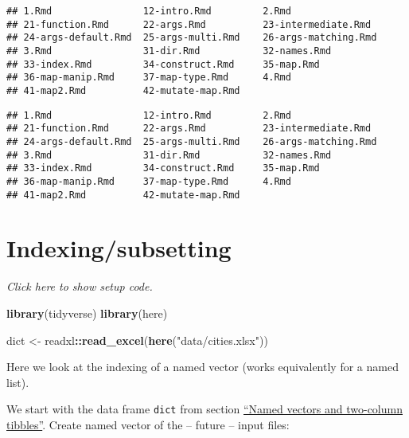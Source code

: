 \documentclass[]{book}
\newenvironment{Shaded}{\begin{snugshade}}{\end{snugshade}}
\newcommand{\KeywordTok}[1]{\textcolor[rgb]{0.13,0.29,0.53}{\textbf{#1}}}
\newcommand{\NormalTok}[1]{#1}
\newcommand{\OperatorTok}[1]{\textcolor[rgb]{0.81,0.36,0.00}{\textbf{#1}}}
\newcommand{\StringTok}[1]{\textcolor[rgb]{0.31,0.60,0.02}{#1}}
\begin{document}
\begin{enumerate}
\begin{verbatim}
## 1.Rmd                12-intro.Rmd         2.Rmd                
## 21-function.Rmd      22-args.Rmd          23-intermediate.Rmd  
## 24-args-default.Rmd  25-args-multi.Rmd    26-args-matching.Rmd 
## 3.Rmd                31-dir.Rmd           32-names.Rmd         
## 33-index.Rmd         34-construct.Rmd     35-map.Rmd           
## 36-map-manip.Rmd     37-map-type.Rmd      4.Rmd                
## 41-map2.Rmd          42-mutate-map.Rmd
\end{verbatim}

\begin{verbatim}
## 1.Rmd                12-intro.Rmd         2.Rmd                
## 21-function.Rmd      22-args.Rmd          23-intermediate.Rmd  
## 24-args-default.Rmd  25-args-multi.Rmd    26-args-matching.Rmd 
## 3.Rmd                31-dir.Rmd           32-names.Rmd         
## 33-index.Rmd         34-construct.Rmd     35-map.Rmd           
## 36-map-manip.Rmd     37-map-type.Rmd      4.Rmd                
## 41-map2.Rmd          42-mutate-map.Rmd
\end{verbatim}
\end{enumerate}

\hypertarget{indexing}{%
\section{Indexing/subsetting}\label{indexing}}

\emph{Click here to show setup code.}

\begin{Shaded}
\begin{Highlighting}[]
\KeywordTok{library}\NormalTok{(tidyverse)}
\KeywordTok{library}\NormalTok{(here)}

\NormalTok{dict <-}\StringTok{ }\NormalTok{readxl}\OperatorTok{::}\KeywordTok{read_excel}\NormalTok{(}\KeywordTok{here}\NormalTok{(}\StringTok{"data/cities.xlsx"}\NormalTok{))}
\end{Highlighting}
\end{Shaded}

Here we look at the indexing of a named vector (works equivalently for a named list).

We start with the data frame \texttt{dict} from section \protect\hyperlink{names}{``Named vectors and two-column tibbles''}.
Create named vector of the -- future -- input files:

\begin{Shaded}
\end{Shaded}
\end{document}
